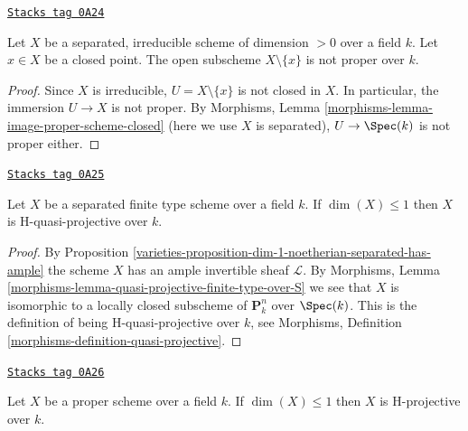 \begin{lemma}
\label{varieties-lemma-proper-minus-point}
\href{https://stacks.math.columbia.edu/tag/0A24}{\texttt{Stacks tag 0A24}}

Let $X$ be a separated, irreducible scheme of dimension $> 0$ over a field $k$.
Let $x \in X$ be a closed point. The open subscheme $X \setminus \{x\}$
is not proper over $k$.
\end{lemma}

\begin{proof}
Since $X$ is irreducible, $U = X \setminus \{x\}$ is not closed in $X$.
In particular, the immersion $U \to X$ is not proper.
By Morphisms, Lemma \ref{morphisms-lemma-image-proper-scheme-closed}
(here we use $X$ is separated), $U \to \Spec(k)$ is not proper either.
\end{proof}

\begin{lemma}
\label{varieties-lemma-dim-1-quasi-projective}
\href{https://stacks.math.columbia.edu/tag/0A25}{\texttt{Stacks tag 0A25}}

Let $X$ be a separated finite type scheme over a field $k$.
If $\dim(X) \leq 1$ then $X$ is H-quasi-projective over $k$.
\end{lemma}

\begin{proof}

By Proposition \ref{varieties-proposition-dim-1-noetherian-separated-has-ample}
the scheme $X$ has an ample invertible sheaf $\mathcal{L}$.
By Morphisms, Lemma \ref{morphisms-lemma-quasi-projective-finite-type-over-S}
we see that $X$ is isomorphic to a locally
closed subscheme of $\mathbf{P}^n_k$ over $\Spec(k)$. This is
the definition of being H-quasi-projective over $k$, see
Morphisms, Definition \ref{morphisms-definition-quasi-projective}.
\end{proof}

\begin{lemma}
\label{varieties-lemma-dim-1-proper-projective}
\href{https://stacks.math.columbia.edu/tag/0A26}{\texttt{Stacks tag 0A26}}

Let $X$ be a proper scheme over a field $k$.
If $\dim(X) \leq 1$ then $X$ is H-projective over $k$.
\end{lemma}

